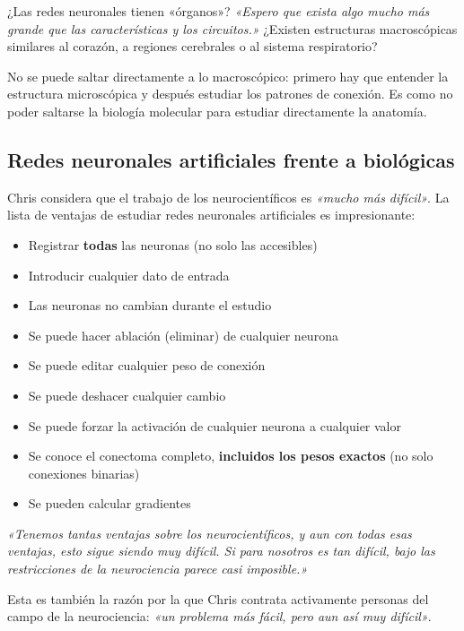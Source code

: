 \begin{knowledgebox}{¿Las redes neuronales tienen «órganos»?}
\textit{«Espero que exista algo mucho más grande que las características y los circuitos.»} ¿Existen estructuras macroscópicas similares al corazón, a regiones cerebrales o al sistema respiratorio?

No se puede saltar directamente a lo macroscópico: primero hay que entender la estructura microscópica y después estudiar los patrones de conexión. Es como no poder saltarse la biología molecular para estudiar directamente la anatomía.
\end{knowledgebox}

\subsection{Redes neuronales artificiales frente a biológicas}

Chris considera que el trabajo de los neurocientíficos es \textit{«mucho más difícil»}. La lista de ventajas de estudiar redes neuronales artificiales es impresionante:

\begin{itemize}
    \item Registrar \textbf{todas} las neuronas (no solo las accesibles)
    \item Introducir cualquier dato de entrada
    \item Las neuronas no cambian durante el estudio
    \item Se puede hacer ablación (eliminar) de cualquier neurona
    \item Se puede editar cualquier peso de conexión
    \item Se puede deshacer cualquier cambio
    \item Se puede forzar la activación de cualquier neurona a cualquier valor
    \item Se conoce el conectoma completo, \textbf{incluidos los pesos exactos} (no solo conexiones binarias)
    \item Se pueden calcular gradientes
\end{itemize}

\textit{«Tenemos tantas ventajas sobre los neurocientíficos, y aun con todas esas ventajas, esto sigue siendo muy difícil. Si para nosotros es tan difícil, bajo las restricciones de la neurociencia parece casi imposible.»}

Esta es también la razón por la que Chris contrata activamente personas del campo de la neurociencia: \textit{«un problema más fácil, pero aun así muy difícil»}.

